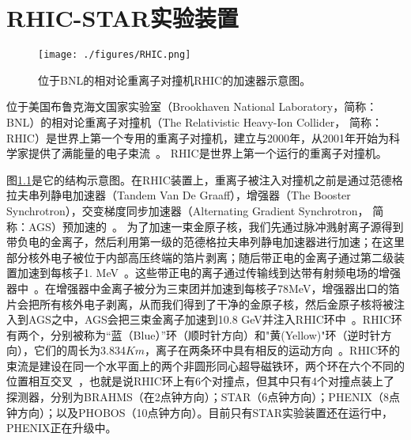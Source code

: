 

\setcounter{section}{0}



\setcounter{figure}{0}
\setcounter{table}{0}
\setcounter{equation}{0}




\chapter{RHIC-STAR实验装置} \vskip -0.5cm

\begin{figure}[htbp]
\centering
\texttt{[image: ./figures/RHIC.png]}
\caption{位于BNL的相对论重离子对撞机RHIC的加速器示意图。}
\label{Fig:RHIC}
\end{figure}


位于美国布鲁克海文国家实验室（Brookhaven National Laboratory，简称：BNL）的相对论重离子对撞机（The Relativistic Heavy-Ion Collider， 简称：RHIC）\cite{harrison2003rhic}是世界上第一个专用的重离子对撞机，建立与2000年，从2001年开始为科学家提供了满能量的电子束流~\cite{qgp}。
RHIC是世界上第一个运行的重离子对撞机\cite{harrison2003rhic}。

图\ref{Fig:RHIC}是它的结构示意图。在RHIC装置上，重离子被注入对撞机之前是通过范德格拉夫串列静电加速器（Tandem Van De Graaff），增强器（The Booster Synchrotron），交变梯度同步加速器（Alternating Gradient Synchrotron， 简称：AGS）预加速的~\cite{qgp,harrison2003rhic}。
为了加速一束金原子核，我们先通过脉冲溅射离子源得到带负电的金离子，然后利用第一级的范德格拉夫串列静电加速器进行加速；在这里部分核外电子被位于内部高压终端的箔片剥离；随后带正电的金离子通过第二级装置加速到每核子1. MeV~\cite{harrison2003rhic, qgp}。这些带正电的离子通过传输线到达带有射频电场的增强器中~\cite{qgp}。在增强器中金离子被分为三束团并加速到每核子78MeV，增强器出口的箔片会把所有核外电子剥离，从而我们得到了干净的金原子核，然后金原子核将被注入到AGS之中，AGS会把三束金离子加速到10.8 GeV并注入RHIC环中~\cite{qgp,harrison2003rhic}。RHIC环有两个，分别被称为“蓝（Blue）”环（顺时针方向）和"黄(Yellow)"环（逆时针方向），它们的周长为3.834$Km$，离子在两条环中具有相反的运动方向~\cite{qgp,harrison2003rhic}。RHIC环的束流是建设在同一个水平面上的两个非圆形同心超导磁铁环，两个环在六个不同的位置相互交叉~\cite{qgp,harrison2003rhic}，也就是说RHIC环上有6个对撞点，但其中只有4个对撞点装上了探测器，分别为BRAHMS（在2点钟方向）；STAR（6点钟方向）；PHENIX（8点钟方向）；以及PHOBOS（10点钟方向）。目前只有STAR实验装置还在运行中，PHENIX正在升级中。


